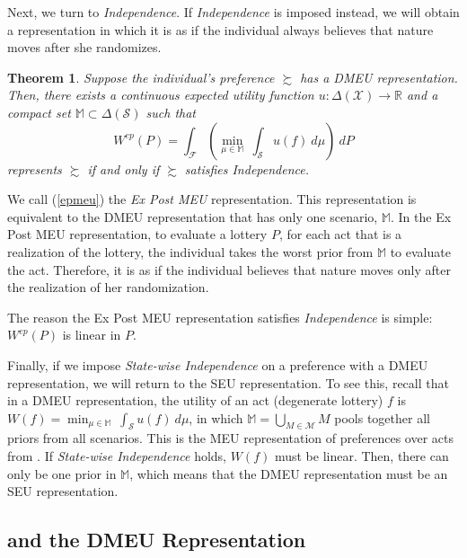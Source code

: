 \documentclass[12pt, notitlepage]{article}
\newtheorem{theorem}{Theorem}
\begin{document}
Next, we turn to \textit{Independence}. If \textit{Independence} is imposed
instead, we will obtain a representation in which it is as if the individual
always believes that nature moves after she randomizes.

\begin{theorem}
\label{eai}Suppose the individual's preference $\succsim $ has a DMEU
representation. Then, there exists a continuous expected utility function $%
u:\Delta (\mathcal{X})\rightarrow \mathbb{R}$ and a compact set $\mathbb{M}%
\subset \Delta (\mathcal{S})$ such that%
\begin{equation}
W^{ep}(P)=\int_{\mathcal{F}}\left( \underset{\mu \in \mathbb{M}}{\min }%
~\int_{\mathcal{S}}u(f)~d\mu \right) ~dP  \label{epmeu}
\end{equation}%
represents $\succsim $ if and only if $\succsim $ satisfies Independence.
\end{theorem}

We call (\ref{epmeu}) the \textit{Ex Post MEU} representation. This
representation is equivalent to the DMEU representation that has only one
scenario, $\mathbb{M}$. In the Ex Post MEU representation, to evaluate a
lottery $P$, for each act that is a realization of the lottery, the
individual takes the worst prior from $\mathbb{M}$ to evaluate the act.
Therefore, it is as if the individual believes that nature moves only after
the realization of her randomization.

The reason the Ex Post MEU representation satisfies \textit{Independence} is
simple: $W^{ep}(P)$ is linear in $P$.

Finally, if we impose \textit{State-wise Independence} on a preference with
a DMEU representation, we will return to the SEU representation. To see
this, recall that in a DMEU representation, the utility of an act
(degenerate lottery) $f$ is $W(f)=\min_{\mu \in \mathbb{M}}~\int_{\mathcal{S}%
}u(f)~d\mu $, in which $\mathbb{M}=\bigcup_{M\in \mathcal{M}}M$ pools
together all priors from all scenarios. This is the MEU representation of
preferences over acts from \cite{GilboaSchmeidler89}. If \textit{State-wise
Independence} holds, $W(f)$ must be linear. Then, there can only be one
prior in $\mathbb{M}$, which means that the DMEU representation must be an
SEU representation.

\subsection{\protect\cite{Saito15} and the DMEU Representation}
\end{document}
